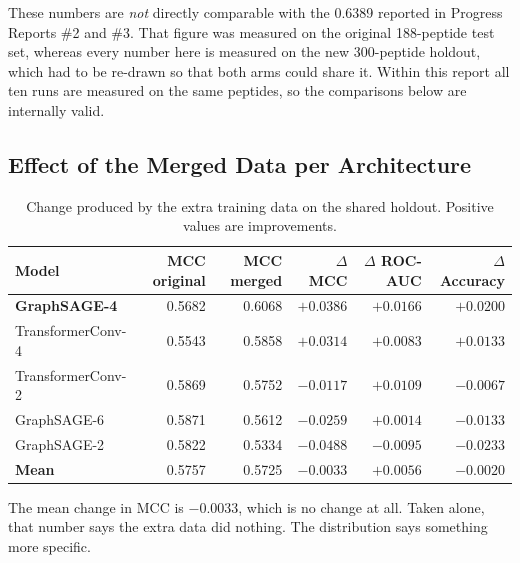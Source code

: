 \documentclass[11pt,a4paper]{article}
\newcommand{\up}[1]{\textcolor{tealx}{#1}}
\newcommand{\dn}[1]{\textcolor{downr}{#1}}
\begin{document}
These numbers are \emph{not} directly comparable with the 0.6389 reported in Progress Reports \#2 and
\#3. That figure was measured on the original 188-peptide test set, whereas every number here is measured
on the new 300-peptide holdout, which had to be re-drawn so that both arms could share it. Within this
report all ten runs are measured on the same peptides, so the comparisons below are internally valid.

\subsection{Effect of the Merged Data per Architecture}
\label{sec:effect}

\begin{table}[h]
\centering\small
\begin{tabular}{@{}lrrrrr@{}}
\toprule
\sffamily\bfseries\color{navy}Model & \sffamily\bfseries\color{navy}MCC original &
\sffamily\bfseries\color{navy}MCC merged & \sffamily\bfseries\color{navy}$\Delta$ MCC &
\sffamily\bfseries\color{navy}$\Delta$ ROC-AUC & \sffamily\bfseries\color{navy}$\Delta$ Accuracy\\
\midrule
\textbf{GraphSAGE-4} & 0.5682 & 0.6068 & \up{$+0.0386$} & \up{$+0.0166$} & \up{$+0.0200$}\\
TransformerConv-4    & 0.5543 & 0.5858 & \up{$+0.0314$} & \up{$+0.0083$} & \up{$+0.0133$}\\
TransformerConv-2    & 0.5869 & 0.5752 & \dn{$-0.0117$} & \up{$+0.0109$} & \dn{$-0.0067$}\\
GraphSAGE-6          & 0.5871 & 0.5612 & \dn{$-0.0259$} & \up{$+0.0014$} & \dn{$-0.0133$}\\
GraphSAGE-2          & 0.5822 & 0.5334 & \dn{$-0.0488$} & \dn{$-0.0095$} & \dn{$-0.0233$}\\
\midrule
\textbf{Mean}        & 0.5757 & 0.5725 & \dn{$-0.0033$} & \up{$+0.0056$} & \dn{$-0.0020$}\\
\bottomrule
\end{tabular}
\caption{Change produced by the extra training data on the shared holdout. Positive values are
improvements.}
\end{table}

The mean change in MCC is $-0.0033$, which is no change at all. Taken alone, that number says the extra
data did nothing. The distribution says something more specific.
\end{document}
